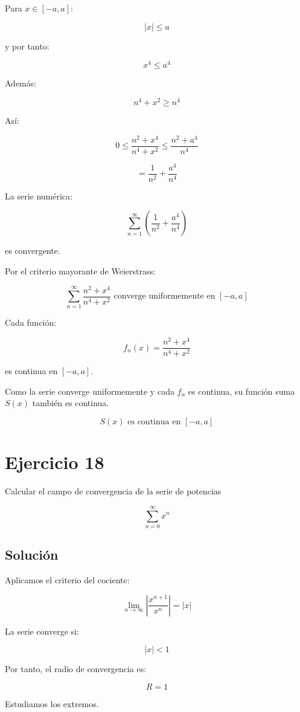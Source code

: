 \documentclass[fleqn]{article}
\begin{document}
	Para $x\in[-a,a]$:

	\[
	|x|\leq a
	\]

	y por tanto:

	\[
	x^4\leq a^4
	\]

	Además:

	\[
	n^4+x^2\geq n^4
	\]

	Así:

	\[
	0\leq
	\frac{n^2+x^4}{n^4+x^2}
	\leq
	\frac{n^2+a^4}{n^4}
	\]

	\[
	=
	\frac{1}{n^2}
	+
	\frac{a^4}{n^4}
	\]

	La serie numérica:

	\[
	\sum_{n=1}^{\infty}
	\left(
	\frac{1}{n^2}
	+
	\frac{a^4}{n^4}
	\right)
	\]

	es convergente.

	Por el criterio mayorante de Weierstrass:

	\[
	\boxed{
	\sum_{n=1}^{\infty}
	\frac{n^2+x^4}{n^4+x^2}
	\text{ converge uniformemente en }[-a,a]
	}
	\]

	Cada función:

	\[
	f_n(x)=
	\frac{n^2+x^4}{n^4+x^2}
	\]

	es continua en $[-a,a]$.

	Como la serie converge uniformemente y cada $f_n$ es continua, su función suma $S(x)$ también es continua.

	\[
	\boxed{
	S(x)\text{ es continua en }[-a,a]
	}
	\]

\section{Ejercicio 18}
	Calcular el campo de convergencia de la serie de potencias

	\[
	\sum_{n=0}^{\infty}x^n
	\]

	\subsection{Solución}

	Aplicamos el criterio del cociente:

	\[
	\lim_{n\to\infty}
	\left|
	\frac{x^{n+1}}{x^n}
	\right|
	=
	|x|
	\]

	La serie converge si:

	\[
	|x|<1
	\]

	Por tanto, el radio de convergencia es:

	\[
	\boxed{
	R=1
	}
	\]

	Estudiamos los extremos.
\end{document}
